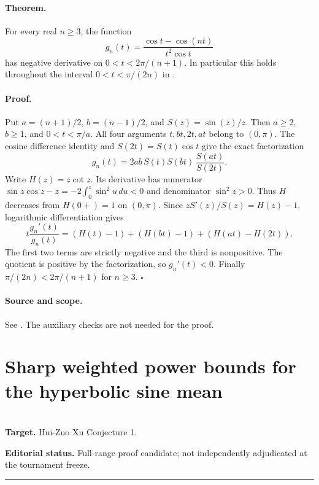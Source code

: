 \documentclass[11pt,a4paper]{article}
\begin{document}
\paragraph{Theorem.} For every real $n\ge3$, the function
\[
   g_n(t)=\frac{\cos t-\cos(nt)}{t^2\cos t}
\]
has negative derivative on $0<t<2\pi/(n+1)$. In particular this holds
throughout the interval $0<t<\pi/(2n)$ in \cite{R23T:plain1}.

\paragraph{Proof.} Put $a=(n+1)/2$, $b=(n-1)/2$, and
$S(z)=\sin(z)/z$. Then $a\ge2$, $b\ge1$, and $0<t<\pi/a$.
All four arguments $t,bt,2t,at$ belong to $(0,\pi)$. The cosine
difference identity and $S(2t)=S(t)\cos t$ give the exact factorization
\[
          g_n(t)=2ab\,S(t)S(bt)\,\frac{S(at)}{S(2t)}.
\]
Write $H(z)=z\cot z$. Its derivative has numerator
$\sin z\cos z-z=-2\int_0^z\sin^2 u\,du<0$ and denominator $\sin^2 z>0$.
Thus $H$ decreases from $H(0+)=1$ on $(0,\pi)$.
Since $zS'(z)/S(z)=H(z)-1$, logarithmic differentiation gives
\[
 t\frac{g_n'(t)}{g_n(t)}=
 (H(t)-1)+(H(bt)-1)+(H(at)-H(2t)).
\]
The first two terms are strictly negative and the third is nonpositive.
The quotient is positive by the factorization, so $g_n'(t)<0$. Finally
$\pi/(2n)<2\pi/(n+1)$ for $n\ge3$. \hfill$\square$

\paragraph{Source and scope.} See \cite{R23T:plain1}. The auxiliary checks are not needed for the proof.
\endgroup


\clearpage

\section{Sharp weighted power bounds for the hyperbolic sine mean}
\label{section:R23S}
\\[3pt]
\noindent\textbf{Target.} Hui-Zuo Xu Conjecture 1.

\noindent\textbf{Editorial status.} Full-range proof candidate; not independently adjudicated at the tournament freeze. 

\smallskip\hrule\medskip



\begingroup
\newcommand{\sh}{M_{\sinh}}
\newcommand{\csch}{\operatorname{csch}}
\setcounter{equation}{0}
\renewcommand{\theequation}{\thesection.\arabic{equation}}
\renewcommand{\theHequation}{R23S.\arabic{equation}}
\end{document}

